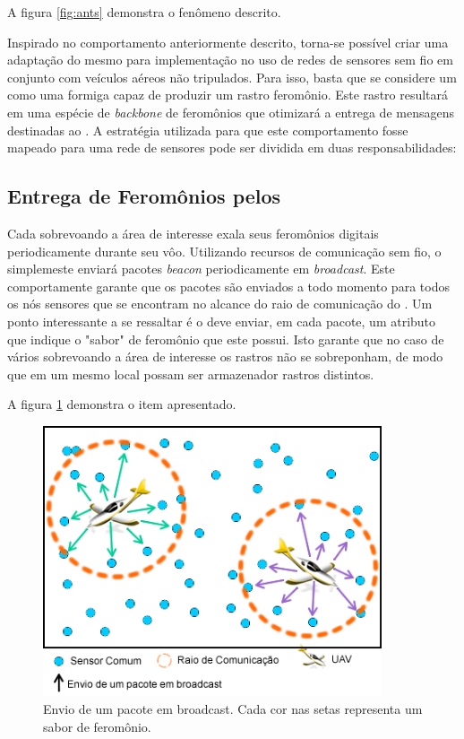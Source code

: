 A figura \ref{fig:ants} demonstra o fenômeno descrito.



Inspirado no comportamento anteriormente descrito, torna-se possível criar uma adaptação do mesmo para implementação no uso de redes de sensores sem fio em conjunto com veículos aéreos não tripulados. Para isso, basta que se considere um \vant como uma formiga capaz de produzir um rastro feromônio. Este rastro resultará em uma espécie de \emph{backbone} de feromônios que otimizará a entrega de mensagens destinadas ao \vant. A estratégia utilizada para que este comportamento fosse mapeado para uma rede de sensores pode ser dividida em duas responsabilidades:

\subsection{Entrega de Feromônios pelos \vants}
Cada \vant sobrevoando a área de interesse exala seus feromônios digitais periodicamente durante seu vôo. Utilizando recursos de comunicação sem fio, o \vant simplemeste enviará pacotes \emph{beacon} periodicamente em \emph{broadcast}. Este comportamente garante que os pacotes são enviados a todo momento para todos os nós sensores que se encontram no alcance do raio de comunicação do \vant. Um ponto interessante a se ressaltar é o \vant deve enviar, em cada pacote, um atributo que indique o "sabor" de feromônio que este \vant possui. Isto garante que no caso de vários \vants sobrevoando a área de interesse os rastros não se sobreponham, de modo que em um mesmo local possam ser armazenador rastros distintos.

A figura \ref{fig:broadcast} demonstra o item apresentado.

 \begin{figure}[h!]
 \centering
 \includegraphics[width=10cm]{pictures/broadcast.png}
 \caption{Envio de um pacote em broadcast. Cada cor nas setas representa um sabor de feromônio.}
  \label{fig:broadcast}
 \end{figure}

